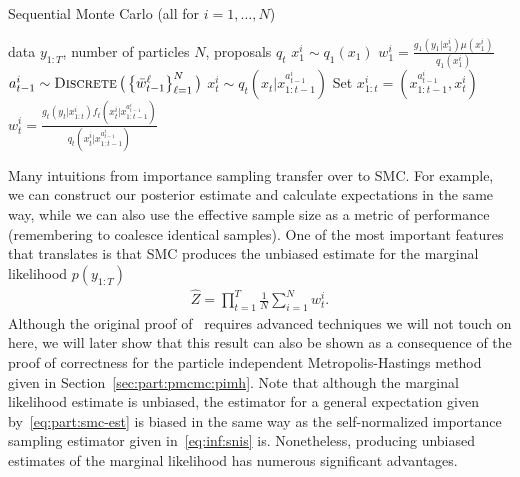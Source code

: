 \begin{algorithm}[tb]
	\caption{Sequential Monte Carlo \hfill {\small (all for $i=1,\ldots,N$)}}
	\label{alg:part:smc}
	\begin{spacing}{1.2}
		\begin{algorithmic}[1]
			\renewcommand{\algorithmicrequire}{\textbf{Inputs:}}
			\renewcommand{\algorithmicensure}{\textbf{Outputs:}}				 
			\Require  data $y_{1:T}$, number of particles $N$, proposals $q_t$
			\State $x_1^i \sim q_1(x_1)$
			\State $w_1^i = \frac{g_1(y_1|x_1^i) \mu(x_1^i)}{q_1(x_1^i)}$
			\State $a_{t-1}^i \sim \operatorname*{\textsc{Discrete}}\big(\left\{\bar w_{t-1}^{\ell}\right\}_{\ell=1}^N\big)$%
			\State $x_t^i \sim q_t(x_t | x_{1:t-1}^{a_{t-1}^i})$ 
			\State Set $x_{1:t}^i = (x_{1:t-1}^{a_{t-1}^i},x_t^i)$
			\State $w_t^i = \frac{g_t(y_t|x_{1:t}^i) f_t(x_t^i | x_{1:t-1}^{a_{t-1}^i})}{q_t(x_t^i|x_{1:t-1}^{a_{t-1}^i})}$
			\EndFor
		\end{algorithmic}
	\end{spacing}
\end{algorithm}

Many intuitions from importance sampling transfer over to SMC.  For example, we can construct our posterior
estimate and calculate expectations in the same way, while we can also use the effective sample size as
a metric of performance (remembering to coalesce identical samples). 
One of the most important features that translates is that SMC produces the
unbiased estimate for the marginal likelihood $p(y_{1:T})$
\begin{align}
\label{eq:part:ML}
\hat Z = \prod_{t=1}^T \frac{1}{N} \sum_{i=1}^N w_{t}^{i}.
\end{align}
Although the original proof of~\cite{del2004feynman} requires advanced techniques we 
will not touch on here, we will later show that this result can also be shown
as a consequence of the proof of correctness for the particle independent Metropolis-Hastings method
given in Section~\ref{sec:part:pmcmc:pimh}.  Note that although the marginal likelihood estimate is
unbiased, the estimator for a general expectation given by~\eqref{eq:part:smc-est} is biased in the same
way as the self-normalized importance sampling estimator given in~\eqref{eq:inf:snis} is.  Nonetheless, producing unbiased
estimates of the marginal likelihood has numerous significant advantages.  

